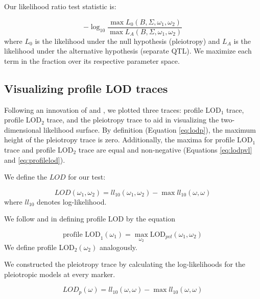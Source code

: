 \documentclass[12pt,twoside, lineno]{gsajnl}
\begin{document}
\noindent Our likelihood ratio test statistic is:

\begin{equation}
- \log_{10} \frac{\max L_0(B, \Sigma, \omega_1, \omega_2)}{\max L_A(B, \Sigma, \omega_1, \omega_2)}
\label{eqn:test-statistic}
\end{equation}
where $L_0$ is the likelihood under the null hypothesis (pleiotropy) and $L_A$ is the likelihood under the alternative hypothesis (separate QTL). We maximize each term in the fraction over its respective parameter space.

\subsection{Visualizing profile LOD traces}

Following an innovation of \citet{zeng2000genetic} and \citet{tian2016dissection}, we plotted three traces: profile LOD$_1$ trace, profile LOD$_2$ trace, and the pleiotropy trace to aid in visualizing the two-dimensional likelihood surface. By definition (Equation \ref{eq:lodp}), the maximum height of the pleiotropy trace is zero. Additionally, the maxima for profile LOD$_1$ trace and profile LOD$_2$ trace are equal and non-negative (Equations \ref{eq:lodpvl} and \ref{eq:profilelod}).

We define the $LOD$ for our test:

\begin{equation}
LOD(\omega_1, \omega_2) = ll_{10}(\omega_1, \omega_2) - \max ll_{10}(\omega, \omega)
\label{eq:lodpvl}
\end{equation}
where $ll_{10}$ denotes log-likelihood.

We follow \citet{zeng2000genetic} and \citet{tian2016dissection} in defining profile LOD by the equation

\begin{equation}
\text{profile LOD}_1(\omega_1) = \max_{\omega_2}\text{LOD}_{pvl}(\omega_1, \omega_2)
\label{eq:profilelod}
\end{equation}
We define profile LOD$_2(\omega_2)$ analogously.

We constructed the pleiotropy trace by calculating the log-likelihoods for the pleiotropic models at every marker.

\begin{equation}
LOD_{p}(\omega) = ll_{10}(\omega, \omega) - \max ll_{10}(\omega, \omega)
\label{eq:lodp}
\end{equation}
\end{document}

